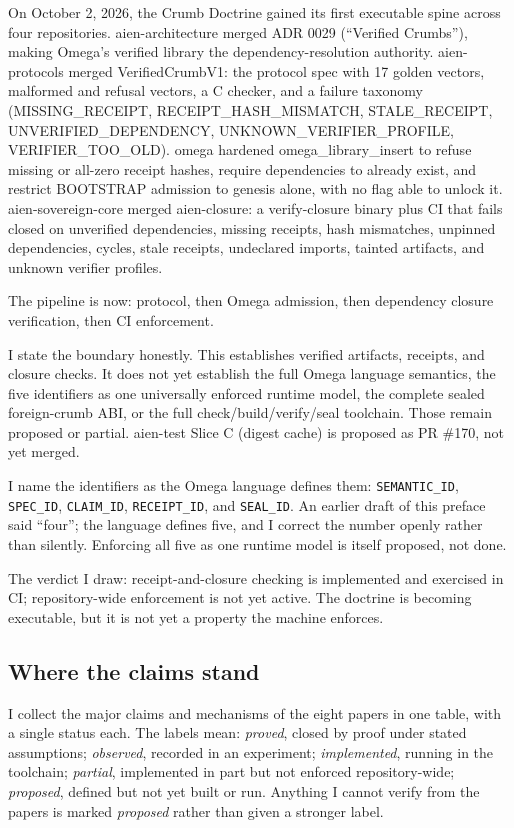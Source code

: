 \documentclass[11pt,letterpaper]{article}
\begin{document}
On October 2, 2026, the Crumb Doctrine gained its first executable spine across four repositories. aien-architecture merged ADR 0029 (``Verified Crumbs''), making Omega's verified library the dependency-resolution authority. aien-protocols merged VerifiedCrumbV1: the protocol spec with 17 golden vectors, malformed and refusal vectors, a C checker, and a failure taxonomy (MISSING\_RECEIPT, RECEIPT\_HASH\_MISMATCH, STALE\_RECEIPT, UNVERIFIED\_DEPENDENCY, UNKNOWN\_VERIFIER\_PROFILE, VERIFIER\_TOO\_OLD). omega hardened omega\_library\_insert to refuse missing or all-zero receipt hashes, require dependencies to already exist, and restrict BOOTSTRAP admission to genesis alone, with no flag able to unlock it. aien-sovereign-core merged aien-closure: a verify-closure binary plus CI that fails closed on unverified dependencies, missing receipts, hash mismatches, unpinned dependencies, cycles, stale receipts, undeclared imports, tainted artifacts, and unknown verifier profiles.

The pipeline is now: protocol, then Omega admission, then dependency closure verification, then CI enforcement.

I state the boundary honestly. This establishes verified artifacts, receipts, and closure checks. It does not yet establish the full Omega language semantics, the five identifiers as one universally enforced runtime model, the complete sealed foreign-crumb ABI, or the full check/build/verify/seal toolchain. Those remain proposed or partial. aien-test Slice C (digest cache) is proposed as PR \#170, not yet merged.

I name the identifiers as the Omega language defines them: \texttt{SEMANTIC\_ID}, \texttt{SPEC\_ID}, \texttt{CLAIM\_ID}, \texttt{RECEIPT\_ID}, and \texttt{SEAL\_ID}. An earlier draft of this preface said ``four''; the language defines five, and I correct the number openly rather than silently. Enforcing all five as one runtime model is itself proposed, not done.

The verdict I draw: receipt-and-closure checking is implemented and exercised in CI; repository-wide enforcement is not yet active. The doctrine is becoming executable, but it is not yet a property the machine enforces.

\subsection*{Where the claims stand}

I collect the major claims and mechanisms of the eight papers in one table, with a single status each. The labels mean: \textit{proved}, closed by proof under stated assumptions; \textit{observed}, recorded in an experiment; \textit{implemented}, running in the toolchain; \textit{partial}, implemented in part but not enforced repository-wide; \textit{proposed}, defined but not yet built or run. Anything I cannot verify from the papers is marked \textit{proposed} rather than given a stronger label.
\end{document}

